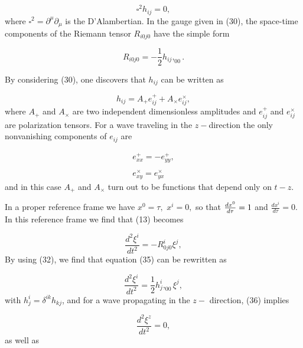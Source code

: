 \documentclass[a4paper,12pt]{article}
\begin{document}
\begin{equation}
\square ^{2}h_{ij}=0,  \label{31}
\end{equation}
where $\square ^{2}=\partial ^{\mu }\partial _{\mu }$ is the D'Alambertian.
In the gauge given in (30), the space-time components of the Riemann tensor $%
R_{i0j0}$ have the simple form

\begin{equation}
R_{i0j0}=-\frac{1}{2}h_{ij},_{00}.  \label{32}
\end{equation}

By considering (30), one discovers that $h_{ij}$ can be written as

\begin{equation}
h_{ij}=A_{+}e_{ij}^{+}+A_{\times }e_{ij}^{\times },  \label{33}
\end{equation}
where $A_{+}$ and $A_{\times }$ are two independent dimensionless amplitudes
and $e_{ij}^{+}$ and $e_{ij}^{\times }$ are polarization tensors. For a wave
traveling in the $z-$direction the only nonvanishing components of $e_{ij}$
are

\begin{equation}
\begin{array}{c}
e_{xx}^{+}=-e_{yy}^{+}, \\ 
\\ 
e_{xy}^{\times }=e_{yx}^{\times }
\end{array}
\label{34}
\end{equation}
and in this case $A_{+}$ and $A_{\times }$ turn out to be functions that
depend only on $t-z$.

In a proper reference frame we have $x^{0}=\tau ,$ $x^{i}=0,$ so that $\frac{%
dx^{0}}{d\tau }=1$ and $\frac{dx^{i}}{d\tau }=0.$ In this reference frame we
find that (13) becomes

\begin{equation}
\frac{d^{2}\xi ^{i}}{dt^{2}}=-R_{0j0}^{i}\xi ^{j},  \label{35}
\end{equation}
By using (32), we find that equation (35) can be rewritten as

\begin{equation}
\frac{d^{2}\xi ^{i}}{dt^{2}}=\frac{1}{2}h_{j}^{i},_{00}\xi ^{j},  \label{36}
\end{equation}
with $h_{j}^{i}=\delta ^{ik}h_{kj}$, and for a wave propagating in the $z-$%
direction, (36) implies

\begin{equation}
\frac{d^{2}\xi ^{z}}{dt^{2}}=0,  \label{37}
\end{equation}
as well as
\end{document}
